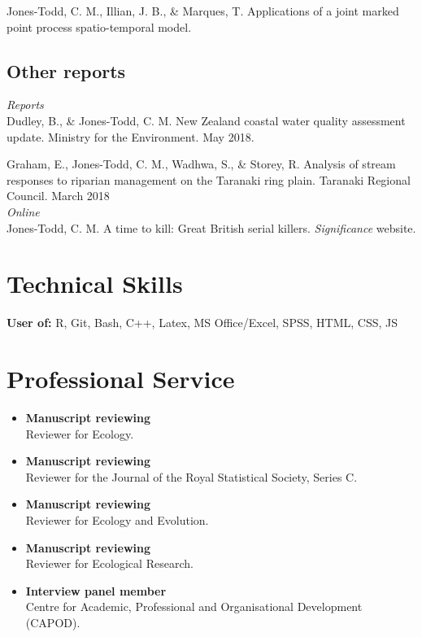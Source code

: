 \documentclass[10pt,a4paper]{moderncv}
\begin{document}
\vspace{-3pt}

Jones-Todd, C. M., Illian, J. B., \& Marques, T. Applications of a joint marked point process spatio-temporal model.\\



\subsection{Other reports}

\vspace{5pt}

\textit{\small{Reports}}\\

Dudley, B., \& Jones-Todd, C. M. New Zealand coastal water quality assessment update. Ministry for the Environment. May 2018.

Graham, E., Jones-Todd, C. M., Wadhwa, S., \& Storey, R. Analysis of stream responses to riparian management on the Taranaki ring plain. Taranaki Regional Council. March 2018\\

\textit{\small{Online}}\\

Jones-Todd, C. M. A time to kill: Great British serial killers. \textit{Significance} website.

\vspace{5pt}


\newpage

\section{Technical Skills}

\vspace{6pt}
    \textbf{User of:} R, Git, Bash, C++, Latex, MS Office/Excel, SPSS, HTML, CSS, JS


\section{Professional Service}

\vspace{6pt}

\begin{itemize}
  \item \textbf{Manuscript reviewing}\\
Reviewer for Ecology.
 \item \textbf{Manuscript reviewing}\\
Reviewer for the Journal of the Royal Statistical Society, Series C.
 \item \textbf{Manuscript reviewing}\\
   Reviewer for Ecology and Evolution.
   \item \textbf{Manuscript reviewing}\\
Reviewer for Ecological Research.
\item \textbf{Interview panel member}\\
 Centre for Academic, Professional and Organisational Development (CAPOD).
\end{itemize}
\end{document}
